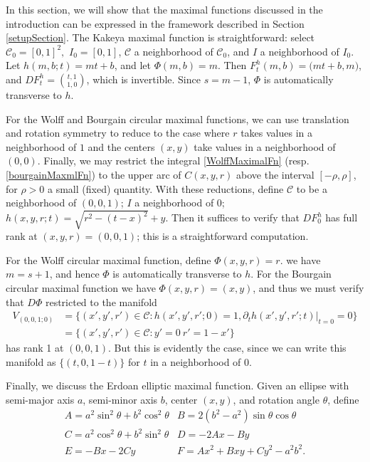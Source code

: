 \documentclass[letterpaper, reqno,11pt]{article}
\numberwithin{equation}{section}
\numberwithin{thm}{section}
\theoremstyle{remark}
\begin{document}
In this section, we will show that the maximal functions discussed in the introduction can be expressed in the framework described in Section \ref{setupSection}. The Kakeya maximal function is straightforward: select $\mathcal{C}_0=[0,1]^2,$ $I_0 = [0,1]$, $\mathcal{C}$ a neighborhood of $\mathcal{C}_0$, and $I$ a neighborhood of $I_0$. Let $h(m,b;t) = mt+b$, and let $\Phi(m,b)= m$. Then $F^h_t(m, b) = \big(mt+b, m)$, and $DF^h_t = \binom{t, 1}{1, 0}$, which is invertible. Since $s=m-1$, $\Phi$ is automatically transverse to $h$.

\medskip

For the Wolff and Bourgain circular maximal functions, we can use translation and rotation symmetry to reduce to the case where $r$ takes values in a  neighborhood of $1$ and the centers $(x,y)$ take values in a neighborhood of $(0,0)$. Finally, we may restrict the integral \eqref{WolffMaximalFn} (resp. \eqref{bourgainMaxmlFn}) to the upper arc of $C(x,y, r)$ above the interval $[-\rho, \rho]$, for $\rho>0$ a small (fixed) quantity. With these reductions, define $\mathcal{C}$ to be a neighborhood of $(0,0,1)$; $I$ a neighborhood of $0$; $h(x,y,r;t) = \sqrt{r^2-(t-x)^2}+y$. Then it suffices to verify that $DF^h_0$ has full rank at $(x,y,r) = (0,0,1)$; this is a straightforward computation. 

For the Wolff circular maximal function, define $\Phi(x,y,r)= r$. we have $m=s+1$, and hence $\Phi$ is automatically transverse to $h$. For the Bourgain circular maximal function we have $\Phi(x,y,r)=(x,y)$, and thus we must verify that $D\Phi$ restricted to the manifold
\begin{equation*}
\begin{split}
V_{(0,0,1;0)} & = \{(x',y',r')\in \mathcal{C}\colon h(x',y',r'; 0) = 1, \partial_t h(x',y',r'; t)|_{t=0} = 0\}\\
& = \{(x',y',r')\in \mathcal{C}\colon y' = 0\ r' = 1- x'\}
\end{split}
\end{equation*}
has rank 1 at $(0,0,1)$. But this is evidently the case, since we can write this manifold as $\{ (t, 0, 1-t) \}$ for $t$ in a neighborhood of 0. 


\medskip

Finally, we discuss the Erdoan elliptic maximal function. Given an ellipse with semi-major axis $a$, semi-minor axis $b$, center $(x,y)$, and rotation angle $\theta$, define
\begin{equation}\label{AThruF}
\begin{array}{ll}
A= a^2\sin^2\theta + b^2\cos^2\theta & 
B=2(b^2-a^2)\sin\theta\cos\theta \\
C=a^2\cos^2\theta+b^2\sin^2\theta &
D=-2Ax-By \\ 
E=-Bx-2Cy &
F=Ax^2+Bxy+Cy^2-a^2b^2.
\end{array}
\end{equation}
\end{document}
